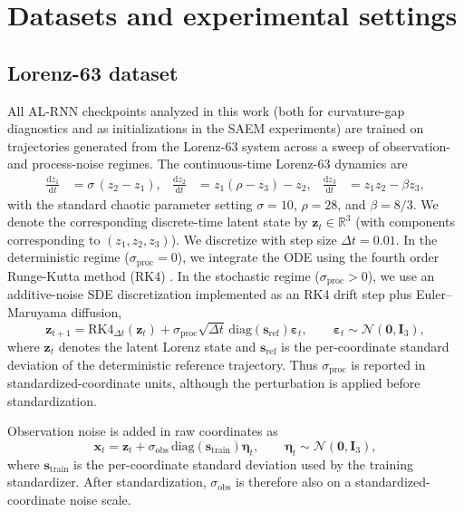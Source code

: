 \documentclass[twoside]{article}
\theoremstyle{plain}
\theoremstyle{definition}
\theoremstyle{remark}
\begin{document}
\section{Datasets and experimental settings}
\label{sec:s:datasets}
\subsection{Lorenz-63 dataset}
All AL-RNN checkpoints analyzed in this work (both for curvature-gap diagnostics and as initializations in the SAEM experiments) are trained on trajectories generated from the Lorenz-63 system \citep{lorenz1963deterministic} across a sweep of observation- and process-noise regimes.
The continuous-time Lorenz-63 dynamics are
\begin{align}
\frac{\mathrm d z_1}{\mathrm d t} &= \sigma\,(z_2-z_1),
&
\frac{\mathrm d z_2}{\mathrm d t} &= z_1(\rho-z_3)-z_2,
&
\frac{\mathrm d z_3}{\mathrm d t} &= z_1 z_2-\beta z_3,
\end{align}
with the standard chaotic parameter setting $\sigma=10$, $\rho=28$, and $\beta=8/3$.
We denote the corresponding discrete-time latent state by $\bm z_t\in\mathbb R^3$ (with components corresponding to $(z_1,z_2,z_3)$).
We discretize with step size $\Delta t=0.01$.
In the deterministic regime ($\sigma_{\mathrm{proc}}=0$), we integrate the ODE using the fourth order Runge-Kutta method (RK4) \citep{kutta1901rungekutta}.
In the stochastic regime ($\sigma_{\mathrm{proc}}>0$), we use an additive-noise SDE discretization implemented as an RK4 drift step plus Euler--Maruyama diffusion,
\begin{equation}
\bm z_{t+1}=\mathrm{RK4}_{\Delta t}(\bm z_t)
+\sigma_{\mathrm{proc}}\sqrt{\Delta t}\,\mathrm{diag}(\bm s_{\mathrm{ref}})\bm\varepsilon_t,
\qquad \bm\varepsilon_t\sim\mathcal N(\bm 0,\bm I_3),
\end{equation}
where $\bm z_t$ denotes the latent Lorenz state and $\bm s_{\mathrm{ref}}$ is the per-coordinate standard deviation of the deterministic reference trajectory. Thus $\sigma_{\mathrm{proc}}$ is reported in standardized-coordinate units, although the perturbation is applied before standardization. 

Observation noise is added in raw coordinates as
\begin{equation}
\bm x_t=\bm z_t+\sigma_{\mathrm{obs}}\,\mathrm{diag}(\bm s_{\mathrm{train}})\bm\eta_t,
\qquad \bm\eta_t\sim\mathcal N(\bm 0,\bm I_3),
\end{equation}
where $\bm s_{\mathrm{train}}$ is the per-coordinate standard deviation used by the training standardizer. After standardization, $\sigma_{\mathrm{obs}}$ is therefore also on a standardized-coordinate noise scale.
\end{document}
